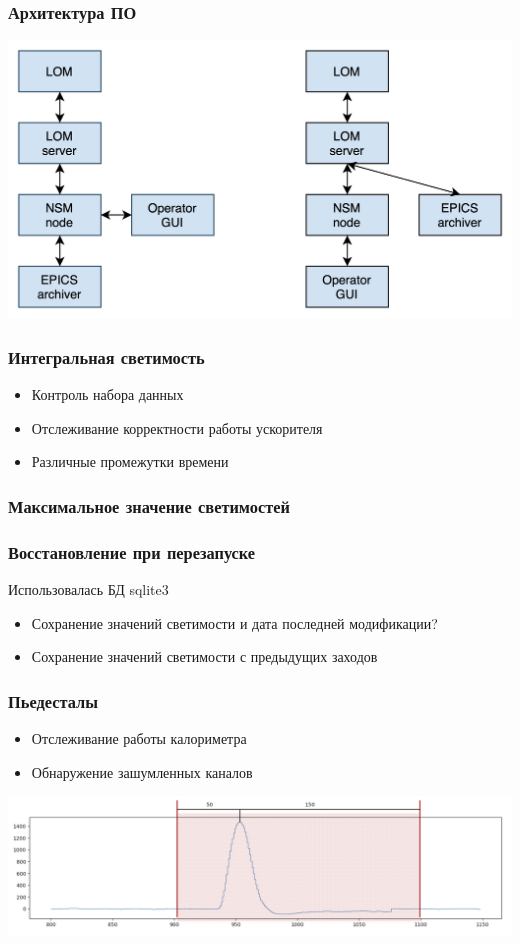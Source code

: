 \documentclass{beamer}
\begin{document}
\begin{frame}
\frametitle{Архитектура ПО}
\includegraphics[width=\textwidth]{Architecture.png}
\end{frame}

\begin{frame}
\frametitle{Интегральная светимость}
    \begin{itemize}
        \item Контроль набора данных
        \item Отслеживание корректности работы ускорителя
        \item Различные промежутки времени
    \end{itemize}
\end{frame}

\begin{frame}
\frametitle{Максимальное значение светимостей}

\end{frame}

\begin{frame}
\frametitle{Восстановление при перезапуске}
    Использовалась БД sqlite3
    \begin{itemize}
        \item Сохранение значений светимости и дата последней модификации?
        \item Сохранение значений светимости с предыдущих заходов
    \end{itemize}
\end{frame}

\begin{frame}
\frametitle{Пьедесталы}
    \begin{itemize}
        \item Отслеживание работы калориметра
        \item Обнаружение зашумленных каналов
    \end{itemize}
    \includegraphics[width=\textwidth]{Pedestal.png}
\end{frame}
\end{document}
